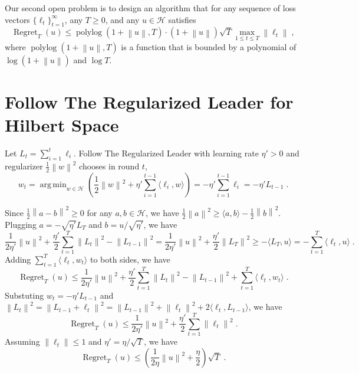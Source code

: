 \documentclass{colt2016} %
\DeclareMathOperator{\Regret}{Regret}
\DeclareMathOperator{\polylog}{polylog}
\renewcommand{\H}{\mathcal{H}}  %
\newcommand{\norm}[1]{\left\|{#1}\right\|}
\DeclareMathOperator*{\argmin}{arg\,min}
\begin{document}
Our second open problem is to design an algorithm that for any
sequence of loss vectors $\{\ell_t\}_{t=1}^\infty$, any $T \ge 0$,
and any $u \in \H$ satisfies
$$
\Regret_T(u) \le \polylog(1 + \norm{u}, T) \cdot (1 + \norm{u}) \sqrt{T} \max_{1 \le t \le T} \norm{\ell_t} \; ,
$$
where $\polylog(1 + \norm{u}, T)$ is a function that is bounded by a polynomial
of $\log(1 + \norm{u})$ and $\log T$.



\appendix

\section{Follow The Regularized Leader for Hilbert Space}

Let $L_t = \sum_{i=1}^t \ell_i$.
Follow The Regularized Leader with learning rate $\eta' > 0$ and regularizer $\frac{1}{2}\norm{w}^2$
chooses in round $t$,
$$
w_t
= \argmin_{w \in \H} \left( \frac{1}{2}\norm{w}^2 + \eta' \sum_{i=1}^{t-1} \langle \ell_i, w \rangle \right)
= - \eta' \sum_{i=1}^{t-1} \ell_i = - \eta' L_{t-1} \; .
$$

Since $\frac{1}{2}\norm{a-b}^2 \ge 0$ for any $a,b \in \H$, we have $\frac{1}{2}\norm{a}^2 \ge \langle a, b \rangle - \frac{1}{2}\norm{b}^2$.
Plugging $a = -\sqrt{\eta'} L_T$ and $b = u/\sqrt{\eta'}$, we have
$$
\frac{1}{2\eta'} \norm{u}^2 + \frac{\eta'}{2} \sum_{t=1}^T \norm{L_t}^2 - \norm{L_{t-1}}^2
= \frac{1}{2\eta'} \norm{u}^2 + \frac{\eta'}{2} \norm{L_T}^2  \ge - \langle L_T, u \rangle
= - \sum_{t=1}^T \langle \ell_t, u \rangle  \; .
$$
Adding $\sum_{t=1}^T \langle \ell_t, w_t \rangle$ to both sides, we have
$$
\Regret_T(u) \le \frac{1}{2\eta'} \norm{u}^2 + \frac{\eta'}{2} \sum_{t=1}^T \norm{L_t}^2 - \norm{L_{t-1}}^2 + \sum_{t=1}^T \langle \ell_t, w_t \rangle \; .
$$
Substuting $w_t = -\eta' L_{t-1}$ and $\norm{L_{t}}^2 = \norm{L_{t-1} + \ell_t}^2 = \norm{L_{t-1}}^2 + \norm{\ell_t}^2 + 2 \langle \ell_t, L_{t-1} \rangle$,
we have
$$
\Regret_T(u) \le \frac{1}{2\eta'} \norm{u}^2 + \frac{\eta'}{2} \sum_{t=1}^T \norm{\ell_t}^2 \; .
$$
Assuming $\norm{\ell_t} \le 1$ and $\eta' = \eta/\sqrt{T}$, we have
$$
\Regret_T(u) \le \left(\frac{1}{2\eta} \norm{u}^2 + \frac{\eta}{2} \right) \sqrt{T} \; .
$$
\end{document}
